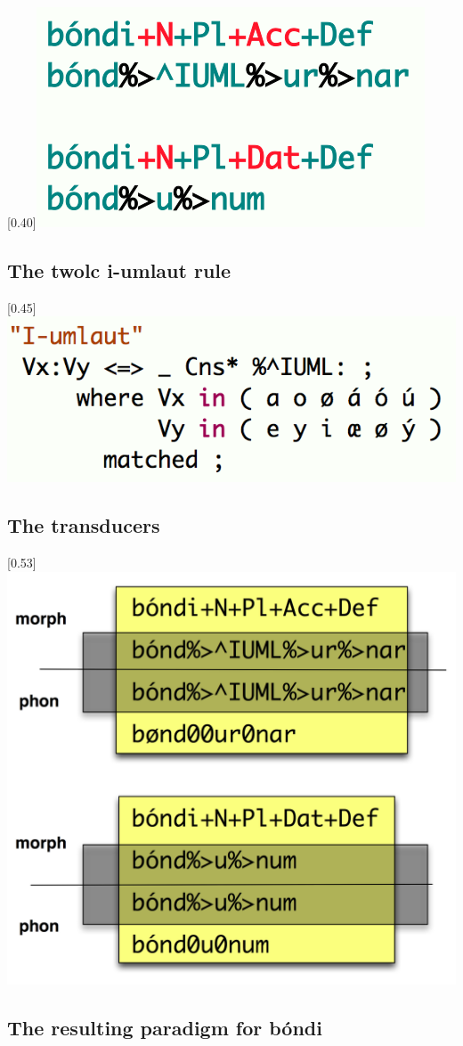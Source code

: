 \documentclass{article}
\begin{document}
\scalebox{0.40}[0.40]{\includegraphics{img/bondi_lexc.png}} \\\subsection{The twolc i-umlaut rule} 
\scalebox{0.45}[0.45]{\includegraphics{img/twoliumlaut.png}} \\\subsection{The transducers} 
\scalebox{0.53}[0.53]{\includegraphics{img/automaton.png}} \\\subsection{The resulting paradigm for bóndi} 
\end{document}
